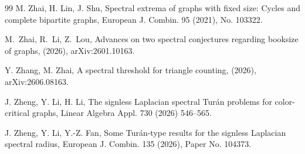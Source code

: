 \documentclass[11pt,a4paper]{article}
\theoremstyle{definition}
\theoremstyle{plain}
\begin{document}
\begin{thebibliography}{99}
 M. Zhai,  H. Lin,  J. Shu, 
Spectral extrema of graphs with fixed size: Cycles and complete bipartite graphs, 
European J. Combin. 95 (2021), No. 103322. 


M.~Zhai, R.~Li, Z.~Lou,
Advances on two spectral conjectures regarding booksize of graphs,  (2026),  arXiv:2601.10163.

Y. Zhang, M. Zhai, 
A spectral threshold for triangle counting, (2026), arXiv:2606.08163. 

J. Zheng,  Y. Li,  H. Li, 
The signless Laplacian spectral Tur\'{a}n problems for color-critical graphs, Linear Algebra Appl. 730 (2026) 546--565.

J. Zheng, Y. Li,  Y.-Z. Fan, Some Tur\'{a}n-type results for the signless Laplacian spectral radius, European J. Combin. 135 (2026), Paper No. 104373. 

\end{thebibliography}
\end{document}
